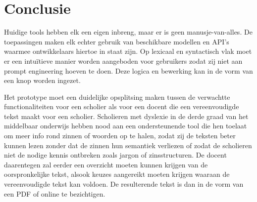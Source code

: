\begin{table}[H]
	\centering
\end{table}

\section{Conclusie}

Huidige tools hebben elk een eigen inbreng, maar er is geen manusje-van-alles. De toepassingen maken elk echter gebruik van beschikbare modellen en API's waarmee ontwikkelaars hiertoe in staat zijn. Op lexicaal en syntactisch vlak moet er een intuïtieve manier worden aangeboden voor gebruikers zodat zij niet aan prompt engineering hoeven te doen. Deze logica en bewerking kan in de vorm van een knop worden ingezet. 

Het prototype moet een duidelijke opsplitsing maken tussen de verwachtte functionaliteiten voor een scholier als voor een docent die een vereenvoudigde tekst maakt voor een scholier. Scholieren met dyslexie in de derde graad van het middelbaar onderwijs hebben nood aan een ondersteunende tool die hen toelaat om meer info rond zinnen of woorden op te halen, zodat zij de teksten beter kunnen lezen zonder dat de zinnen hun semantiek verliezen of zodat de scholieren niet de nodige kennis ontbreken zoals jargon of zinsstructuren. De docent daarentegen zal eerder een overzicht moeten kunnen krijgen van de oorspronkelijke tekst, alsook keuzes aangereikt moeten krijgen waaraan de vereenvoudigde tekst kan voldoen. De resulterende tekst is dan in de vorm van een PDF of online te bezichtigen.

